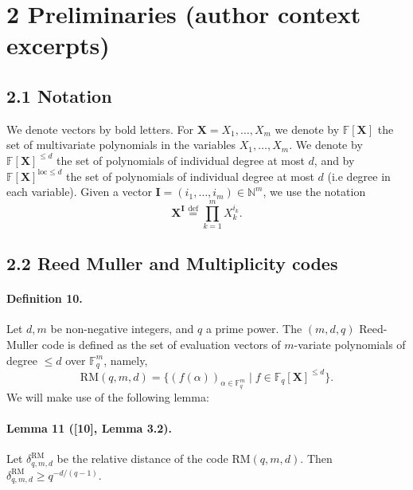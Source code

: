 \section*{2 Preliminaries (author context excerpts)}
\subsection*{2.1 Notation}
We denote vectors by bold letters. For $\boldsymbol X=X_1,\ldots,X_m$ we denote by $\mathbb F[\boldsymbol X]$ the set of multivariate polynomials in the variables $X_1,\ldots,X_m$. We denote by $\mathbb F[\boldsymbol X]^{\leq d}$ the set of polynomials of individual degree at most $d$, and by $\mathbb F[\boldsymbol X]^{\mathrm{loc}\leq d}$ the set of polynomials of individual degree at most $d$ (i.e degree in each variable). Given a vector $\boldsymbol I=(i_1,\ldots,i_m)\in\mathbb N^m$, we use the notation
\[\boldsymbol X^{\boldsymbol I}\stackrel{\mathrm{def}}=\prod_{k=1}^mX_k^{i_k}.\]
\subsection*{2.2 Reed Muller and Multiplicity codes}
\paragraph{Definition 10.} Let $d,m$ be non-negative integers, and $q$ a prime power. The $(m,d,q)$ Reed-Muller code is defined as the set of evaluation vectors of $m$-variate polynomials of degree $\leq d$ over $\mathbb F_q^m$, namely,
\[\mathrm{RM}(q,m,d)=\{(f(\alpha))_{\alpha\in\mathbb F_q^m}\mid f\in\mathbb F_q[\boldsymbol X]^{\leq d}\}.\]
We will make use of the following lemma:
\paragraph{Lemma 11 ([10], Lemma 3.2).} Let $\delta_{q,m,d}^{\mathrm{RM}}$ be the relative distance of the code $\mathrm{RM}(q,m,d)$. Then $\delta_{q,m,d}^{\mathrm{RM}}\geq q^{-d/(q-1)}$.
